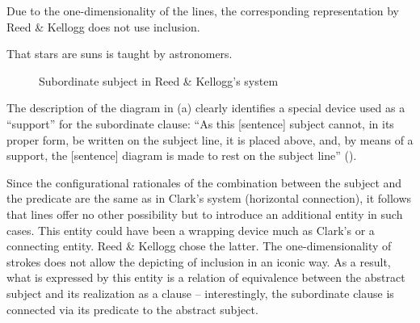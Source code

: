 \documentclass[english,output=paper,colorlinks,citecolor=brown]{../langscibook}
\begin{document}
Due to the one-dimensionality of the lines, the corresponding representation by Reed \& Kellogg does not use inclusion.

\ea \label{ex:4:5} That stars are suns is taught by astronomers. \z


\begin{figure}
    \caption{Subordinate subject in Reed \& Kellogg's system\label{fig:4:10}}
\end{figure}

The description of the diagram in (a) clearly identifies a special device used as a “support” for the subordinate clause: “As this [sentence] subject cannot, in its proper form, be written on the subject line, it is placed above, and, by means of a support, the [sentence] diagram is made to rest on the subject line” (\citealt[107]{ReedBrainerd1879}).

Since the configurational rationales of the combination between the subject and the predicate are the same as in Clark’s system (horizontal connection), it follows that lines offer no other possibility but to introduce an additional entity in such cases. This entity could have been a wrapping device much as Clark’s or a connecting entity. Reed \& Kellogg chose the latter. The one-dimensionality of strokes does not allow the depicting of inclusion in an iconic way. As a result, what is expressed by this entity is a relation of equivalence between the abstract subject and its realization as a clause – interestingly, the subordinate clause is connected via its predicate to the abstract subject.
\end{document}
